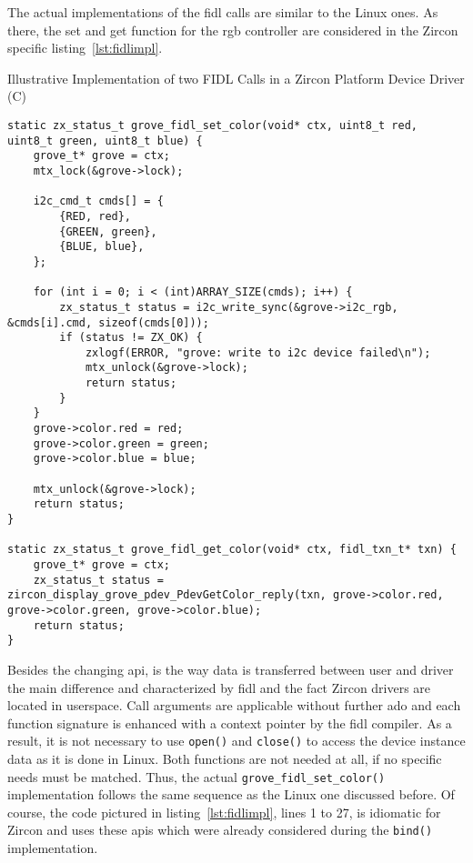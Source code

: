 The actual implementations of the \ac{fidl} calls are similar to the Linux ones.
As there, the set and get function for the \ac{rgb} controller are considered in the Zircon specific listing~\ref{lst:fidlimpl}.
%
\begin{listing} [H]
    \caption{Illustrative Implementation of two FIDL Calls in a Zircon Platform Device Driver (C)}
\label{lst:fidlimpl}
\begin{verbatim}
static zx_status_t grove_fidl_set_color(void* ctx, uint8_t red, uint8_t green, uint8_t blue) {
    grove_t* grove = ctx;
    mtx_lock(&grove->lock);

    i2c_cmd_t cmds[] = {
        {RED, red},
        {GREEN, green},
        {BLUE, blue},
    };

    for (int i = 0; i < (int)ARRAY_SIZE(cmds); i++) {
        zx_status_t status = i2c_write_sync(&grove->i2c_rgb, &cmds[i].cmd, sizeof(cmds[0]));
        if (status != ZX_OK) {
            zxlogf(ERROR, "grove: write to i2c device failed\n");
            mtx_unlock(&grove->lock);
            return status;
        }
    }
    grove->color.red = red;
    grove->color.green = green;
    grove->color.blue = blue;

    mtx_unlock(&grove->lock);
    return status;
}

static zx_status_t grove_fidl_get_color(void* ctx, fidl_txn_t* txn) {
    grove_t* grove = ctx;
    zx_status_t status = zircon_display_grove_pdev_PdevGetColor_reply(txn, grove->color.red, grove->color.green, grove->color.blue);
    return status;
}
\end{verbatim}
\end{listing}
%
Besides the changing \ac{api}, is the way data is transferred between user and driver the main difference and characterized by \ac{fidl} and the fact Zircon drivers are located in userspace.
Call arguments are applicable without further ado and each function signature is enhanced with a context pointer by the \ac{fidl} compiler.
As a result, it is not necessary to use \texttt{open()} and \texttt{close()} to access the device instance data as it is done in Linux.
Both functions are not needed at all, if no specific needs must be matched.
Thus, the actual \texttt{grove_fidl_set_color()} implementation follows the same sequence as the Linux one discussed before.
Of course, the code pictured in listing~\ref{lst:fidlimpl}, lines 1 to 27, is idiomatic for Zircon and uses these \acp{api} which were already considered during the \texttt{bind()} implementation.

